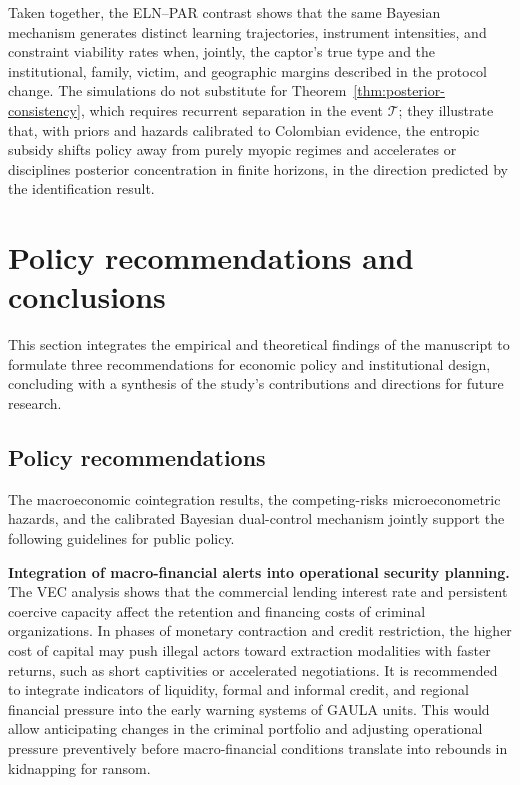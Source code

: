 \documentclass[review,authoryear,12pt]{elsarticle}
\theoremstyle{plain}
\theoremstyle{definition}
\newcommand{\1}{\mathbf{1}}
\begin{document}
Taken together, the ELN--PAR contrast shows that the same Bayesian mechanism generates distinct learning trajectories, instrument intensities, and constraint viability rates when, jointly, the captor's true type and the institutional, family, victim, and geographic margins described in the protocol change. The simulations do not substitute for Theorem~\ref{thm:posterior-consistency}, which requires recurrent separation in the event $\mathcal{T}$; they illustrate that, with priors and hazards calibrated to Colombian evidence, the entropic subsidy shifts policy away from purely myopic regimes and accelerates or disciplines posterior concentration in finite horizons, in the direction predicted by the identification result.

\section{Policy recommendations and conclusions}\label{sec:conclusiones}

This section integrates the empirical and theoretical findings of the manuscript to formulate three recommendations for economic policy and institutional design, concluding with a synthesis of the study's contributions and directions for future research.

\subsection{Policy recommendations}

The macroeconomic cointegration results, the competing-risks microeconometric hazards, and the calibrated Bayesian dual-control mechanism jointly support the following guidelines for public policy.

\textbf{Integration of macro-financial alerts into operational security planning.}\quad
The VEC analysis shows that the commercial lending interest rate and persistent coercive capacity affect the retention and financing costs of criminal organizations. In phases of monetary contraction and credit restriction, the higher cost of capital may push illegal actors toward extraction modalities with faster returns, such as short captivities or accelerated negotiations. It is recommended to integrate indicators of liquidity, formal and informal credit, and regional financial pressure into the early warning systems of GAULA units. This would allow anticipating changes in the criminal portfolio and adjusting operational pressure preventively before macro-financial conditions translate into rebounds in kidnapping for ransom.
\end{document}
